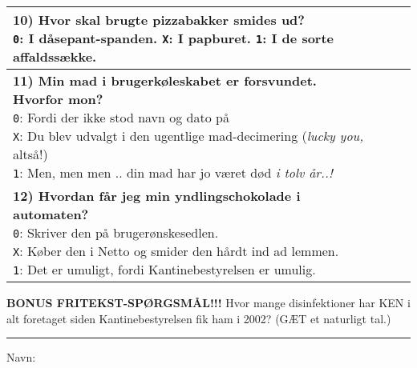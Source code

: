 \documentclass[a4paper]{article}
\begin{document}
\begin{center}
\begin{tabular}{|p{12cm}|p{0.2cm}|p{0.2cm}|p{0.2cm}|}
{  \textbf{10) Hvor skal brugte pizzabakker smides ud?} \\
  \texttt{0}: I dåsepant-spanden. \quad
  \texttt{X}: I papburet. \quad
  \texttt{1}: I de sorte affaldssække.
  \vspace{0.1cm}
} & & & \\\hline
\parbox{12cm}{
  \vspace{0.2cm}
  \textbf{11) Min mad i brugerkøleskabet er forsvundet. Hvorfor mon?}\\
  \texttt{0}: Fordi der ikke stod navn og dato på \quad \\
  \texttt{X}: Du blev udvalgt i den ugentlige mad-decimering (\textit{lucky you,} altså!) \quad \\
  \texttt{1}: Men, men men .. din mad har jo været død \textit{i tolv år..!}
  \vspace{0.1cm}
} & & & \\\hline
\parbox{12cm}{
  \vspace{0.2cm}
  \textbf{12) Hvordan får jeg min yndlingschokolade i automaten?} \\
  \texttt{0}: Skriver den på brugerønskesedlen. \\
  \texttt{X}: Køber den i Netto og smider den hårdt ind ad lemmen. \\
  \texttt{1}: Det er umuligt, fordi Kantinebestyrelsen er umulig.
  \vspace{0.1cm}
} & & & \\\hline
\end{tabular}

\vspace{0.5cm}

{\large\textbf{BONUS FRITEKST-SPØRGSMÅL!!!} Hvor mange disinfektioner har KEN i
alt foretaget siden Kantinebestyrelsen fik ham i 2002? (GÆT et naturligt tal.)
\\ \vspace{0.5cm} \rule{5cm}{0.4pt}}

\vspace{0.5cm}
{\large Navn: \hrulefill}
\end{center}
\end{document}
